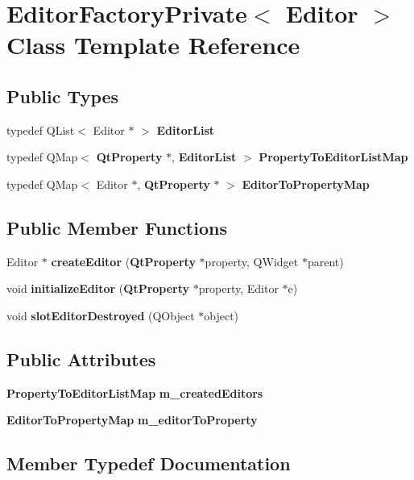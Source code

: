\section{Editor\+Factory\+Private$<$ Editor $>$ Class Template Reference}
\label{classEditorFactoryPrivate}
\subsection*{Public Types}
\begin{DoxyCompactItemize}
\item 
typedef Q\+List$<$ Editor $\ast$ $>$ {\bf Editor\+List}
\item 
typedef Q\+Map$<$ {\bf Qt\+Property} $\ast$, {\bf Editor\+List} $>$ {\bf Property\+To\+Editor\+List\+Map}
\item 
typedef Q\+Map$<$ Editor $\ast$, {\bf Qt\+Property} $\ast$ $>$ {\bf Editor\+To\+Property\+Map}
\end{DoxyCompactItemize}
\subsection*{Public Member Functions}
\begin{DoxyCompactItemize}
\item 
Editor $\ast$ {\bf create\+Editor} ({\bf Qt\+Property} $\ast$property, Q\+Widget $\ast$parent)
\item 
void {\bf initialize\+Editor} ({\bf Qt\+Property} $\ast$property, Editor $\ast$e)
\item 
void {\bf slot\+Editor\+Destroyed} (Q\+Object $\ast$object)
\end{DoxyCompactItemize}
\subsection*{Public Attributes}
\begin{DoxyCompactItemize}
\item 
{\bf Property\+To\+Editor\+List\+Map} {\bf m\+\_\+created\+Editors}
\item 
{\bf Editor\+To\+Property\+Map} {\bf m\+\_\+editor\+To\+Property}
\end{DoxyCompactItemize}


\subsection{Member Typedef Documentation}
